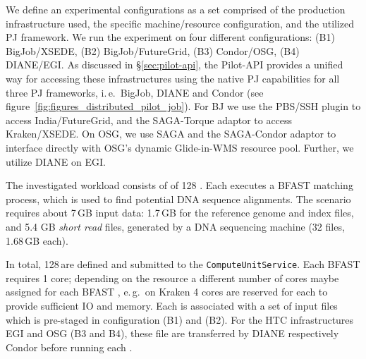 \documentclass{sig-alternate}
\begin{document}
We define an experimental configurations as a set comprised of the
production infrastructure used, the specific machine/resource
configuration, and the utilized PJ framework.  We run the experiment
on four different configurations: (B1) BigJob/XSEDE, (B2)
BigJob/FutureGrid, (B3) Condor/OSG, (B4) DIANE/EGI. As discussed in
\S\ref{sec:pilot-api}, the Pilot-API provides a unified way for
accessing these infrastructures using the native PJ capabilities for
all three PJ frameworks, i.\,e.\ BigJob, DIANE and Condor (see
figure~\ref{fig:figures_distributed_pilot_job}).  For BJ we use the
PBS/SSH plugin to access India/FutureGrid, and the SAGA-Torque adaptor
to access Kraken/XSEDE. On OSG, we use SAGA and the SAGA-Condor
adaptor to interface directly with OSG's dynamic Glide-in-WMS resource
pool. Further, we utilize DIANE on
EGI. %

The investigated workload consists of of 128 \cus. Each \cu executes a
BFAST matching process, which is used to find potential DNA sequence
alignments. The scenario requires about 7\,GB input data: 1.7\,GB for
the reference genome and index files, and 5.4 GB \textit{short read}
files, generated by a DNA sequencing machine (32 files, 1.68\,GB
each).

In total, 128\,\cus are defined and submitted to the
\texttt{Compute\-Unit\-Service}. Each BFAST \cu requires 1 core;
depending on the resource a different number of cores maybe assigned
for each BFAST \cu, e.\,g.\ on Kraken 4 cores are reserved for each
\cu to provide sufficient IO and memory. Each \cu is associated with a
set of input files which is pre-staged in configuration (B1) and
(B2). For the HTC infrastructures EGI and OSG (B3 and B4),
these file are transferred by DIANE respectively Condor before running
each \cu.  %

\end{document}
